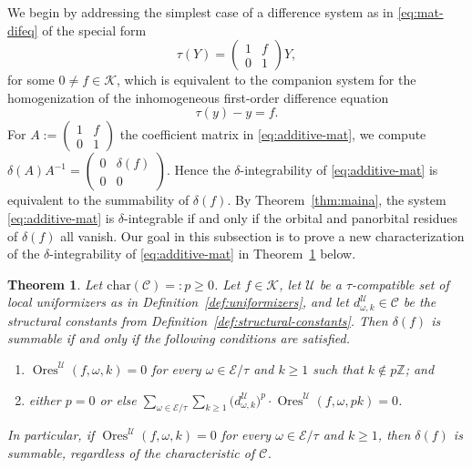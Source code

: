 \documentclass[preprint,12pt]{elsarticle}
\numberwithin{equation}{section} %
\theoremstyle{theorem}
\newtheorem{theorem}{Theorem}[section]
\theoremstyle{definition}
\newcommand{\Ca}{\mathcal{C}} %
\newcommand{\bk}{\mathcal{K}} %
\newcommand{\ec}{\mathcal{E}} %
\newcommand{\orbita}{{\ec/\tau}} %
\newcommand{\Z}{\mathbb{Z}} %
\DeclareMathOperator{\ores}{Ores}
\begin{document}
We begin by addressing the simplest case of a difference system as in \eqref{eq:mat-difeq} of the special form \begin{equation}\label{eq:additive-mat}\tau(Y)=\begin{pmatrix} 1 & f \\ 0 & 1\end{pmatrix}Y,\end{equation} for some $0\neq f\in\bk$, which is equivalent to the companion system for the homogenization of the inhomogeneous first-order difference equation \begin{equation}\label{eq:additive-scal}\tau(y)-y=f.\end{equation} For $A:=\left(\begin{smallmatrix} 1 & f \\ 0 & 1\end{smallmatrix}\right)$ the coefficient matrix in \eqref{eq:additive-mat}, we compute $\delta(A)A^{-1}=\left(\begin{smallmatrix} 0 & \delta(f) \\ 0 & 0\end{smallmatrix}\right)$. Hence the $\delta$-integrability of \eqref{eq:additive-mat} is equivalent to the summability of $\delta(f)$. By Theorem~\ref{thm:maina}, the system \eqref{eq:additive-mat} is $\delta$-integrable if and only if the orbital and panorbital residues of $\delta(f)$ all vanish. Our goal in this subsection is to prove a new characterization of the $\delta$-integrability of \eqref{eq:additive-mat} in Theorem~\ref{thm:additive-integrability} below. 

\begin{theorem}\label{thm:additive-integrability} Let $\mathrm{char}(\Ca)=:p\geq 0$. Let $f\in\bk$, let $\mathcal{U}$ be a $\tau$-compatible set of local uniformizers as in Definition~\ref{def:uniformizers}, and let $d^\mathcal{U}_{\omega,k}\in\Ca$ be the structural constants from Definition~\ref{def:structural-constants}. Then $\delta(f)$ is summable if and only if the following conditions are satisfied.
\begin{enumerate}
    \item $\ores^\mathcal{U}(f,\omega,k)=0$ for every $\omega\in\orbita$ and $k\geq 1$ such that $k\notin p\Z$; and
    \item either $p=0$ or else $\displaystyle \sum_{\omega\in\orbita}\sum_{k\geq 1}\bigl(d^\mathcal{U}_{\omega,k}\bigr)^p\cdot\ores^\mathcal{U}(f,\omega,pk)=0$.
\end{enumerate}
In particular, if $\ores^\mathcal{U}(f,\omega,k)=0$ for every $\omega\in\orbita$ and $k\geq 1$, then $\delta(f)$ is summable, regardless of the characteristic of $\Ca$.
\end{theorem}
\end{document}
